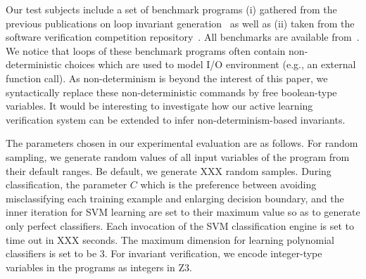 Our test subjects include a set of benchmark programs %
(i) gathered from
 the previous publications on loop invariant generation~\cite{???}  as well as
 (ii)
taken  from
 the software verification competition repository~\cite{Dirk:SVCOMP:2016}.
All benchmarks are available from~\cite{zilu}.
We notice that loops of these benchmark programs often contain non-deterministic choices
which are used to model I/O environment (e.g., an external function call).
As non-determinism is beyond the interest of this paper,
we syntactically replace these non-deterministic commands by  free boolean-type variables.
It would be interesting to investigate how
 our active learning verification system can be extended
to infer non-determinism-based invariants.

The parameters chosen in our experimental evaluation are as follows.
For random sampling, we generate random values of all input variables of the program from their default ranges. Be default, we generate XXX random samples. 
During classification, the parameter $C$ which is the preference between avoiding misclassifying each training example and enlarging decision boundary,
and the inner iteration for SVM learning are set to their maximum value so as to generate only perfect classifiers. Each invocation of the SVM classification engine is set to time out in XXX seconds. The maximum dimension for learning polynomial classifiers is set to be 3. For invariant verification, we encode integer-type variables in the programs as integers in Z3. 


